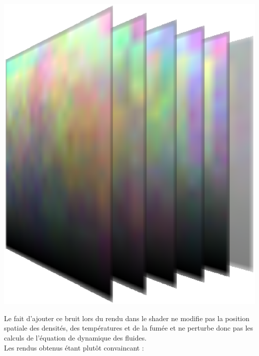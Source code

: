 \documentclass[a4paper,10pt]{article}
\begin{document}
\begin{center}
\includegraphics[scale=0.3]{Perlin3D.ps}
\end{center}

Le fait d'ajouter ce bruit lors du rendu dans le shader ne modifie pas la position spatiale des densités, des températures et de la fumée et ne perturbe donc pas les calculs de l'équation de dynamique des fluides.\\ 

Les rendus obtenus étant plutôt convaincant :\\
\end{document}
